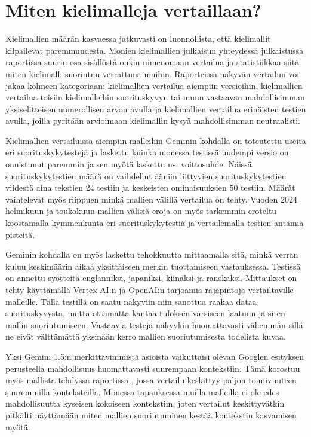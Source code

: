 \section{Miten kielimalleja vertaillaan?}

Kielimallien määrän kasvaessa jatkuvasti on luonnollista, että kielimallit
kilpailevat paremmuudesta. Monien kielimallien julkaisun yhteydessä
julkaistussa raportissa suurin osa sisällöstä onkin nimenomaan vertailua ja
statistiikkaa siitä miten kielimalli suoriutuu verrattuna muihin. Raporteissa
näkyvän vertailun voi jakaa kolmeen kategoriaan: kielimallien vertailua
aiempiin versioihin, kielimallien vertailua toisiin kielimalleihin
suorituskyvyn tai muun vastaavan mahdollisimman yksiselitteisen numerollisen
arvon avulla ja kielimallien vertailua erinäisten testien avulla, joilla
pyritään arvioimaan kielimallin kysyä mahdollisimman neutraalisti.

Kielimallien vertailuissa aiempiin malleihin Geminin kohdalla on toteutettu
useita eri suorituskykytestejä ja laskettu kuinka monessa testissä uudempi
versio on onnistunut paremmin ja sen myötä laskettu ns. voittosuhde. Näissä
suorituskykytestien määrä on vaihdellut ääniin liittyvien suorituskykytestien
viidestä aina tekstien 24 testiin ja keskeisten ominaisuuksien 50 testiin.
Määrät vaihtelevat myös riippuen minkä mallien välillä vertailua on tehty.
Vuoden 2024 helmikuun ja toukokuun mallien välisiä eroja on myös tarkemmin
eroteltu koostamalla kymmenkunta eri suorituskykytestiä ja vertailemalla
testien antamia pisteitä. \parencite{googleDeepmindGeminiv1_5report}

Geminin kohdalla on myös laskettu tehokkuutta mittaamalla sitä, minkä verran
kuluu keskimäärin aikaa yksittäiseen merkin tuottamiseen vastauksessa. Testissä
on annettu syötteitä englanniksi, japaniksi, kiinaksi ja ranskaksi. Mittaukset
on tehty käyttämällä Vertex AI:n ja OpenAI:n tarjoamia rajapintoja
vertailtaville malleille. \parencite{googleDeepmindGeminiv1_5report} Tällä
testillä on saatu näkyviin niin sanottua raakaa dataa suorituskyvystä, mutta
ottamatta kantaa tuloksen varsiseen laatuun ja siten mallin suoriutumiseen.
Vastaavia testejä näkyykin huomattavasti vähemmän sillä ne eivät välttämättä
yksinään kerro mallien suoriutumisesta todelista kuvaa.

Yksi Gemini 1.5:n merkittävimmistä asioista vaikuttaisi olevan Googlen
esityksen \parencite{googleKeynote2024} perusteella mahdollisuus huomattavasti
suurempaan kontekstiin. Tämä korostuu myös mallista tehdyssä raportissa
\parencite{googleDeepmindGeminiv1_5report}, jossa vertailu keskittyy paljon
toimivuuteen suuremmilla konteksteilla. Monessa tapauksessa muilla malleilla ei
ole edes mahdollisuutta kyseisen kokoiseen kontekstiin, joten vertailut
keskittyvätkin pitkälti näyttämään miten mallien suoriutuminen kestää
kontekstin kasvamisen myötä.

